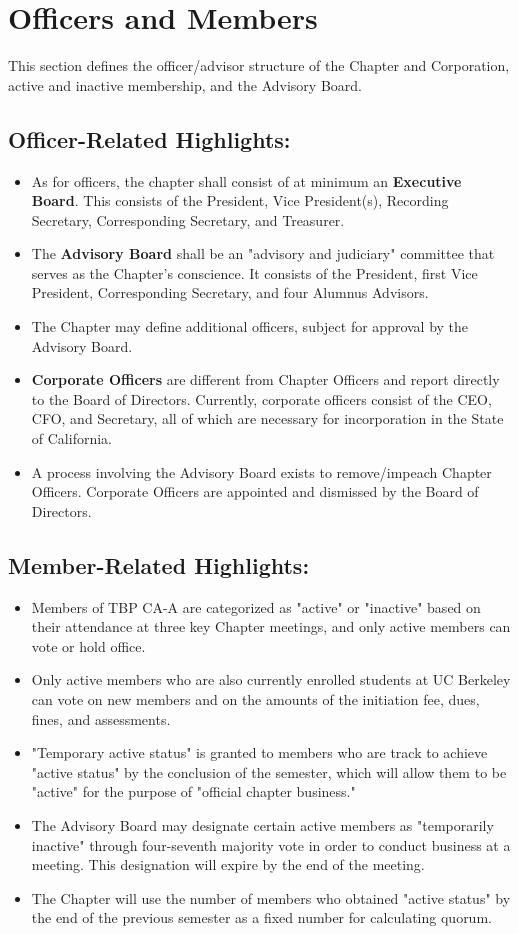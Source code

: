 \documentclass{article}
\begin{document}
	\section {Officers and Members}
	This section defines the officer/advisor structure of the Chapter and Corporation, active and inactive membership, and the Advisory Board. 
	\subsection {Officer-Related Highlights:}
	\begin{itemize}
		\item As for officers, the chapter shall consist of at minimum an \textbf{Executive Board}. This consists of the President, Vice President(s), Recording Secretary, Corresponding Secretary, and Treasurer.
		\item The \textbf{Advisory Board} shall be an "advisory and judiciary" committee that serves as the Chapter's conscience. It consists of the President, first Vice President, Corresponding Secretary, and four Alumnus Advisors.
		\item The Chapter may define additional officers, subject for approval by the Advisory Board.
		\item \textbf{Corporate Officers} are different from Chapter Officers and report directly to the Board of Directors. Currently, corporate officers consist of the CEO, CFO, and Secretary, all of which are necessary for incorporation in the State of California.
		\item A process involving the Advisory Board exists to remove/impeach Chapter Officers. Corporate Officers are appointed and dismissed by the Board of Directors.
	\end{itemize}
	
	\subsection {Member-Related Highlights:}
	\begin{itemize}
		\item Members of TBP CA-A are categorized as "active" or "inactive" based on their attendance at three key Chapter meetings, and only active members can vote or hold office.
		\item Only active members who are also currently enrolled students at UC Berkeley can vote on new members and on the amounts of the initiation fee, dues, fines, and assessments.
		\item "Temporary active status" is granted to members who are track to achieve "active status" by the conclusion of the semester, which will allow them to be "active" for the purpose of "official chapter business."
		\item The Advisory Board may designate certain active members as "temporarily inactive" through four-seventh majority vote in order to conduct business at a meeting. This designation will expire by the end of the meeting.
		\item The Chapter will use the number of members who obtained "active status" by the end of the previous semester as a fixed number for calculating quorum.
	\end{itemize}
	
\end{document}

